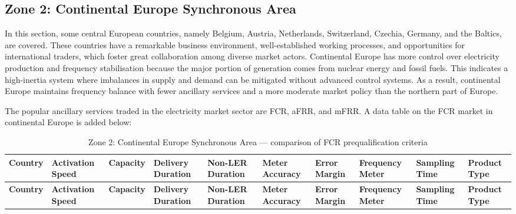 \clearpage
\begin{landscape}


    \subsection{Zone 2: Continental Europe Synchronous Area}
In this section, some central European countries, namely Belgium, Austria, Netherlands, Switzerland, Czechia, Germany, and the Baltics, are covered. These countries have a remarkable business environment, well-established working processes, and opportunities for international traders, which foster great collaboration among diverse market actors. Continental Europe has more control over electricity production and frequency stabilisation because the major portion of generation comes from nuclear energy and fossil fuels. This indicates a high-inertia system where imbalances in supply and demand can be mitigated without advanced control systems. As a result, continental Europe maintains frequency balance with fewer ancillary services and a more moderate market policy than the northern part of Europe.

The popular ancillary services traded in the electricity market sector are FCR, aFRR, and mFRR. A data table on the FCR market in continental Europe is added below:

\tiny
\setlength{\tabcolsep}{2pt}
\renewcommand{\arraystretch}{1.3}
\setlength{\LTleft}{0pt}
\setlength{\LTright}{0pt}
\begin{longtable}{|p{1.8cm}|p{2.2cm}|p{2.2cm}|p{2.2cm}|p{2.5cm}|p{1.5cm}|p{2.2cm}|p{4cm}|p{2.5cm}|p{2cm}|}
\caption{Zone 2: Continental Europe Synchronous Area --- comparison of FCR prequalification criteria}\label{tab:continental_europe_fcr}\\
\hline
\textbf{Country} & \textbf{Activation Speed} & \textbf{Capacity} & \textbf{Delivery Duration} & \textbf{Non-LER Duration} & \textbf{Meter Accuracy} & \textbf{Error Margin} & \textbf{Frequency Meter} & \textbf{Sampling Time} & \textbf{Product Type} \\
\hline
\endfirsthead

\hline
\textbf{Country} & \textbf{Activation Speed} & \textbf{Capacity} & \textbf{Delivery Duration} & \textbf{Non-LER Duration} & \textbf{Meter Accuracy} & \textbf{Error Margin} & \textbf{Frequency Meter} & \textbf{Sampling Time} & \textbf{Product Type} \\
\hline
\endhead


\end{longtable}
\end{landscape}
